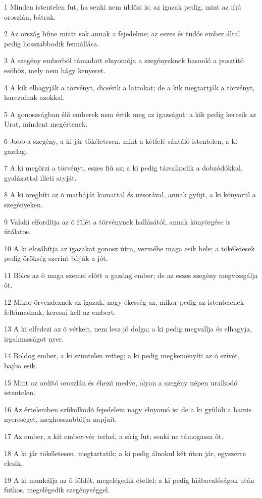 \par 1 Minden istentelen fut, ha senki nem üldözi is; az igazak pedig, mint az ifjú oroszlán, bátrak.
\par 2 Az ország bûne miatt sok annak a fejedelme; az eszes és tudós ember által pedig hosszabbodik fennállása.
\par 3 A szegény emberbõl támadott elnyomója a szegényeknek hasonló a pusztító esõhöz, mely nem hágy kenyeret.
\par 4 A kik elhagyják a törvényt, dicsérik a latrokat; de a kik megtartják a törvényt, harczolnak azokkal.
\par 5 A gonoszságban élõ emberek nem értik meg az igazságot; a kik pedig keresik az Urat, mindent megértenek.
\par 6 Jobb a szegény, a ki jár tökéletesen, mint a kétfelé sántáló istentelen, a ki gazdag.
\par 7 A ki megõrzi a törvényt, eszes fiú az; a ki pedig társalkodik a dobzódókkal, gyalázattal illeti atyját.
\par 8 A ki öregbíti az õ marháját kamattal és uzsorával, annak gyûjt, a ki könyörül a szegényeken.
\par 9 Valaki elfordítja az õ fülét a törvénynek hallásától, annak könyörgése is útálatos.
\par 10 A ki elcsábítja az igazakat gonosz útra, vermébe maga esik bele; a tökéletesek pedig örökség szerint bírják a jót.
\par 11 Bölcs az õ maga szemei elõtt a gazdag ember; de az eszes szegény megvizsgálja õt.
\par 12 Mikor örvendeznek az igazak, nagy ékesség az; mikor pedig az istentelenek feltámadnak, keresni kell az embert.
\par 13 A ki elfedezi az õ vétkeit, nem lesz jó dolga; a ki pedig megvallja és elhagyja, irgalmasságot nyer.
\par 14 Boldog ember, a ki szüntelen retteg; a ki pedig megkeményíti az õ szívét, bajba esik.
\par 15 Mint az ordító oroszlán és éhezõ medve, olyan a szegény népen uralkodó istentelen.
\par 16 Az értelemben szûkölködõ fejedelem nagy elnyomó is; de a ki gyûlöli a hamis nyereséget, meghosszabbítja napjait.
\par 17 Az ember, a kit ember-vér terhel, a sírig fut; senki ne támogassa õt.
\par 18 A ki jár tökéletesen, megtartatik; a ki pedig álnokul két úton jár, egyszerre elesik.
\par 19 A ki munkálja az õ földét, megelégedik étellel; a ki pedig hiábavalóságok után futkos, megelégedik szegénységgel.
